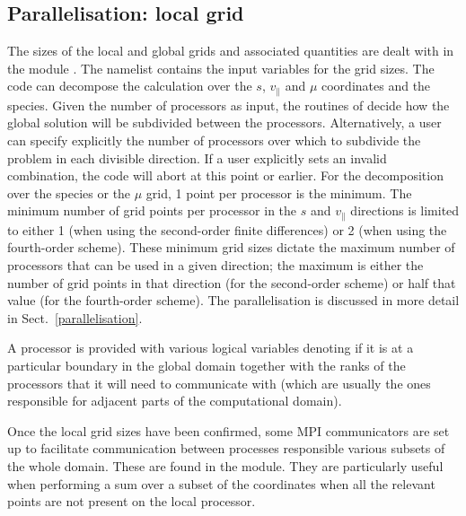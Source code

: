 \subsection{Parallelisation: local grid}

The sizes of the local and global grids and associated quantities are dealt with in
the module . The namelist  contains the input
variables for the grid sizes. The code can decompose the calculation over the
$s$, $v_\parallel$ and $\mu$ coordinates and the species. Given the number of
processors as input, the routines of  decide how the global solution
will be subdivided between the processors. Alternatively, a user can specify
explicitly the number of processors over which to subdivide the problem in each
divisible direction. 
If a user explicitly sets 
an invalid combination, the code will abort at this point or earlier.
For the decomposition over the species or the $\mu$ grid, 1 point per processor is the minimum.
The minimum number of grid points per processor in the $s$ and $v_\parallel$ directions is limited to either 1 (when using the
second-order finite differences) or 2 (when using the fourth-order scheme). 
These minimum grid sizes dictate the maximum number of processors that can be used
in a given direction; the maximum is either the number of grid points in that direction (for the second-order scheme)
or half that value (for the fourth-order scheme). 
The parallelisation is discussed in more detail in Sect.~\ref{parallelisation}.

A processor is provided with various logical variables denoting if it is at a particular
boundary in the global domain together with the ranks of the processors that it
will need to communicate with (which are usually the ones responsible for adjacent
parts of the computational domain).

Once the local grid sizes have been confirmed, some MPI communicators are set up
to facilitate communication between processes responsible various subsets of
the whole domain. These are found in the  module.
They are particularly useful when performing a sum over a subset of the coordinates
when all the relevant points are not present on the local processor.

